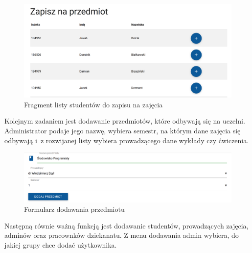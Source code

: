 \documentclass[openright]{xmgr}
\begin{document}
\begin{figure}[th!]
\centering
\includegraphics[width=1.1\hsize]{images/addStudent}
\caption{Fragment listy studentów do zapisu na zajęcia\label{RYS.5}}
\end{figure}

\noindent Kolejnym zadaniem jest dodawanie przedmiotów, które odbywają się na uczelni. Administrator podaje jego nazwę, wybiera semestr, na którym dane zajęcia się odbywają i~z rozwijanej listy wybiera prowadzącego dane wykłady czy ćwiczenia.

\begin{figure}[th!]
\centering
\includegraphics[width=1.1\hsize]{images/addSubject}
\caption{Formularz dodawania przedmiotu\label{RYS.6}}
\end{figure}

\newpage

\noindent Następną równie ważną funkcją jest dodawanie studentów, prowadzących zajęcia, adminów oraz pracownków dziekanatu. Z menu dodawania admin wybiera, do jakiej grupy chce dodać użytkownika.
\end{document}

